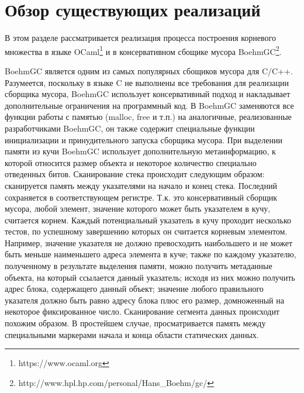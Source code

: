 \section{Обзор существующих реализаций}
В этом разделе рассматривается реализация процесса построения корневого множества в языке OCaml\footnote{https://www.ocaml.org} и в консервативном сбощике мусора BoehmGC\footnote{http://www.hpl.hp.com/personal/Hans\_Boehm/gc/}.

BoehmGC является одним из самых популярных сбощиков мусора для C/C++. Разумеется, поскольку в языке C не выполнены все требования для реализации сборщика мусора, BoehmGC использует консервативный подход и накладывает дополнительные ограничения на программный код. В BoehmGC заменяются все функции работы с памятью (malloc, free и т.п.) на аналогичные, реализованные разработчиками BoehmGC, он также содержит специальные функции инициализации и принудительного запуска сборщика мусора. При выделении памяти из кучи BoehmGC использует дополнительную метаинформацию, к которой относится размер объекта и некоторое количество специально отведенных битов. Сканирование стека происходит следующим образом: сканируется память между указателями на начало и конец стека. Последний сохраняется в соответствующем регистре. Т.к. это консервативный сборщик мусора, любой элемент, значение которого может быть указателем в кучу, считается корнем. Каждый потенциальный указатель в кучу проходит несколько тестов, по успешному завершению которых он считается корневым элементом. Например, значение указателя не должно превосходить наибольшего и не может быть меньше наименьшего адреса элемента в куче; также по каждому указателю, полученному в результате выделения памяти, можно получить метаданные объекта, на который ссылается данный указатель; исходя из них можно получить адрес блока, содержащего данный объект; значение любого правильного указателя должно быть равно адресу блока плюс его размер, домноженный на некоторое фиксированное число. Сканирование сегмента данных происходит похожим образом. В простейшем случае, просматривается память между специальными маркерами начала и конца области статических данных.

